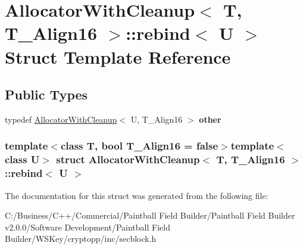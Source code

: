 \hypertarget{struct_allocator_with_cleanup_1_1rebind}{
\section{AllocatorWithCleanup$<$ T, T\_\-Align16 $>$::rebind$<$ U $>$ Struct Template Reference}
\label{struct_allocator_with_cleanup_1_1rebind}
}
\subsection*{Public Types}
\begin{DoxyCompactItemize}
\item 
\hypertarget{struct_allocator_with_cleanup_1_1rebind_a2a7f2cba8e94ea40fd2cc02e95808530}{
typedef \hyperlink{class_allocator_with_cleanup}{AllocatorWithCleanup}$<$ U, T\_\-Align16 $>$ {\bfseries other}}
\label{struct_allocator_with_cleanup_1_1rebind_a2a7f2cba8e94ea40fd2cc02e95808530}

\end{DoxyCompactItemize}
\subsubsection*{template$<$class T, bool T\_\-Align16 = false$>$template$<$class U$>$ struct AllocatorWithCleanup$<$ T, T\_\-Align16 $>$::rebind$<$ U $>$}



The documentation for this struct was generated from the following file:\begin{DoxyCompactItemize}
\item 
C:/Business/C++/Commercial/Paintball Field Builder/Paintball Field Builder v2.0.0/Software Development/Paintball Field Builder/WSKey/cryptopp/inc/secblock.h\end{DoxyCompactItemize}
